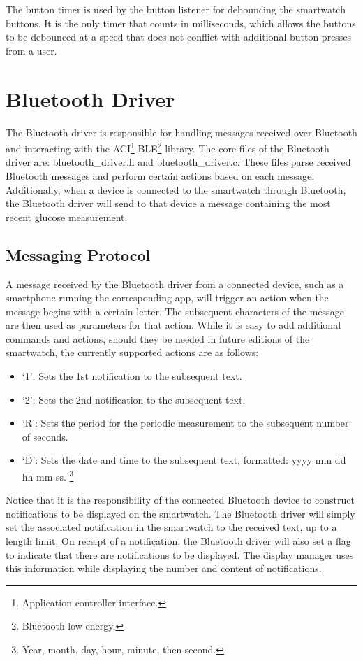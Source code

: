 The button timer is used by the button listener for debouncing the smartwatch buttons. It is the only timer that counts in milliseconds, which allows the buttons to be debounced at a speed that does not conflict with additional button presses from a user.

\nl

\section{Bluetooth Driver}
The Bluetooth driver is responsible for handling messages received over Bluetooth and interacting with the ACI\footnote{Application controller interface.} BLE\footnote{Bluetooth low energy.} library. The core files of the Bluetooth driver are: bluetooth\_driver.h and bluetooth\_driver.c. These files parse received Bluetooth messages and perform certain actions based on each message. Additionally, when a device is connected to the smartwatch through Bluetooth, the Bluetooth driver will send to that device a message containing the most recent glucose measurement.

\subsection{Messaging Protocol}
A message received by the Bluetooth driver from a connected device, such as a smartphone running the corresponding app, will trigger an action when the message begins with a certain letter. The subsequent characters of the message are then used as parameters for that action. While it is easy to add additional commands and actions, should they be needed in future editions of the smartwatch, the currently supported actions are as follows:

\singlespacing
\begin{itemize}
  \item{} `1': Sets the 1st notification to the subsequent text.
  \item{} `2': Sets the 2nd notification to the subsequent text.
  \item{} `R': Sets the period for the periodic measurement to the subsequent number of seconds.
  \item{} `D': Sets the date and time to the subsequent text, formatted: yyyy mm dd hh mm ss. \footnote{Year, month, day, hour, minute, then second.}
\end{itemize}
\doublespacing
Notice that it is the responsibility of the connected Bluetooth device to construct notifications to be displayed on the smartwatch. The Bluetooth driver will simply set the associated notification in the smartwatch to the received text, up to a length limit. On receipt of a notification, the Bluetooth driver will also set a flag to indicate that there are notifications to be displayed. The display manager uses this information while displaying the number and content of notifications.

